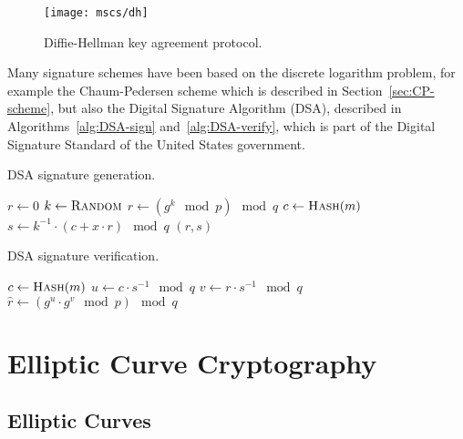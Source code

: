 \begin{figure}[hb]
  \centering
  \texttt{[image: mscs/dh]}
  \caption{Diffie-Hellman key agreement protocol.}
  \label{msc:DH}
\end{figure}

Many signature schemes have been based on the discrete logarithm problem, for
example the Chaum-Pedersen scheme which is described in
Section~\ref{sec:CP-scheme}, but also the Digital Signature Algorithm (DSA),
described in Algorithms~\ref{alg:DSA-sign} and~\ref{alg:DSA-verify}, which is
part of the Digital Signature Standard of the United States government.

\begin{algorithm}[H]
  \caption{DSA signature generation.}
  \label{alg:DSA-sign}
  \addtolength{\baselineskip}{1mm}
  \begin{algorithmic}[1]
      \State $r \gets 0$
        \State $k \gets \Call{Random}{}$
        \State $r \gets (g^k \mod p) \mod q$
      \EndWhile
      \State $c \gets \Call{Hash}{m}$
      \State $s \gets k^{-1} \cdot (c + x \cdot r) \mod q$
      \Return $(r, s)$
    \EndFunction
  \end{algorithmic}
\end{algorithm}
\begin{algorithm}[H]
  \caption{DSA signature verification.}
  \label{alg:DSA-verify}
  \addtolength{\baselineskip}{1mm}
  \begin{algorithmic}[1]
      \State $c \gets \Call{Hash}{m}$
      \State $u \gets c \cdot s^{-1} \mod q$
      \State $v \gets r \cdot s^{-1} \mod q$
      \State $\hat{r} \gets (g^u \cdot g^v \mod p) \mod q$
        \Return {}
      \EndIf
      \Return {}
    \EndFunction
  \end{algorithmic}
\end{algorithm}



\section{Elliptic Curve Cryptography}

\subsection{Elliptic Curves}

